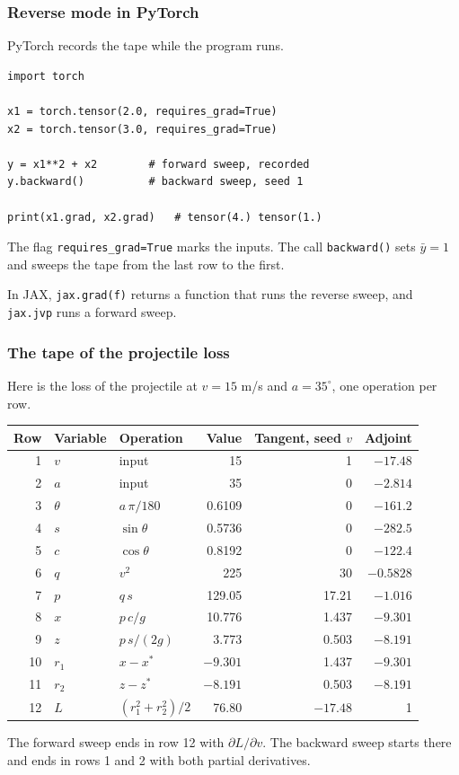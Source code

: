 \documentclass{beamer}
\begin{document}
\begin{frame}[fragile]
\frametitle{Reverse mode in PyTorch}
PyTorch records the tape while the program runs.
\begin{verbatim}
import torch

x1 = torch.tensor(2.0, requires_grad=True)
x2 = torch.tensor(3.0, requires_grad=True)

y = x1**2 + x2        # forward sweep, recorded
y.backward()          # backward sweep, seed 1

print(x1.grad, x2.grad)   # tensor(4.) tensor(1.)
\end{verbatim}
The flag \texttt{requires\_grad=True} marks the inputs.
The call \texttt{backward()} sets $\bar y=1$ and sweeps the tape from the last row to the first.
\medskip

In JAX, \texttt{jax.grad(f)} returns a function that runs the reverse sweep, and \texttt{jax.jvp} runs a forward sweep.
\end{frame}

\begin{frame}
\frametitle{The tape of the projectile loss}
Here is the loss of the projectile at $v=15$ m/s and $a=35^\circ$, one operation per row.
\begin{center}
\footnotesize
\renewcommand{\arraystretch}{0.9}
\begin{tabular}{rllrrr}
\toprule
Row & Variable & Operation & Value & Tangent, seed $v$ & Adjoint\\
\midrule
1 & $v$ & input & 15 & 1 & $-17.48$\\
2 & $a$ & input & 35 & 0 & $-2.814$\\
3 & $\theta$ & $a\,\pi/180$ & 0.6109 & 0 & $-161.2$\\
4 & $s$ & $\sin\theta$ & 0.5736 & 0 & $-282.5$\\
5 & $c$ & $\cos\theta$ & 0.8192 & 0 & $-122.4$\\
6 & $q$ & $v^2$ & 225 & 30 & $-0.5828$\\
7 & $p$ & $q\,s$ & 129.05 & 17.21 & $-1.016$\\
8 & $x$ & $p\,c/g$ & 10.776 & 1.437 & $-9.301$\\
9 & $z$ & $p\,s/(2g)$ & 3.773 & 0.503 & $-8.191$\\
10 & $r_1$ & $x-x^*$ & $-9.301$ & 1.437 & $-9.301$\\
11 & $r_2$ & $z-z^*$ & $-8.191$ & 0.503 & $-8.191$\\
12 & $L$ & $(r_1^2+r_2^2)/2$ & 76.80 & $-17.48$ & 1\\
\bottomrule
\end{tabular}
\end{center}
\small
The forward sweep ends in row 12 with $\partial L/\partial v$.
The backward sweep starts there and ends in rows 1 and 2 with both partial derivatives.
\end{frame}
\end{document}
